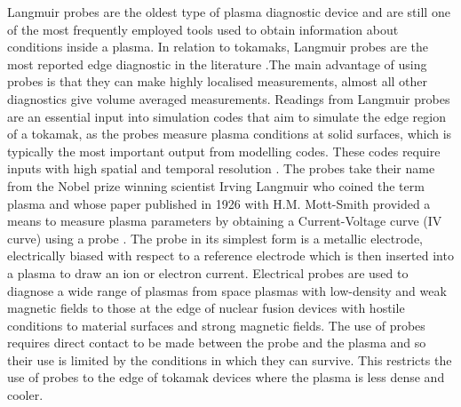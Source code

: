 
Langmuir probes are the oldest type of plasma diagnostic device and are still one of the most frequently employed tools used to obtain information about conditions inside a plasma. In relation to tokamaks, Langmuir probes are the most reported edge diagnostic in the literature \cite{matthews}.The main advantage of using probes is that they can make highly localised measurements, almost all other diagnostics give volume averaged measurements. Readings from Langmuir probes are an essential input into simulation codes that aim to simulate the edge region of a tokamak, as the probes measure plasma conditions at solid surfaces, which is typically the most important output from modelling codes. These codes require inputs with high spatial and temporal resolution \cite{first_wall}. The probes take their name from the Nobel prize winning scientist Irving Langmuir who coined the term plasma and whose paper published in 1926 with H.M. Mott-Smith provided a means to measure plasma parameters by obtaining a Current-Voltage curve (IV curve) using a probe \cite{mottsmith}. The probe in its simplest form is a metallic electrode, electrically biased with respect to a reference electrode which is then inserted into a plasma to draw an ion or electron current. %
Electrical probes are used to diagnose a wide range of plasmas from space plasmas with low-density and weak magnetic fields to those at the edge of nuclear fusion devices with hostile conditions to material surfaces and strong magnetic fields. The use of probes requires direct contact to be made between the probe and the plasma and so their use is limited by the conditions in which they can survive. This restricts the use of probes to the edge of tokamak devices where the plasma is less dense and cooler. 
